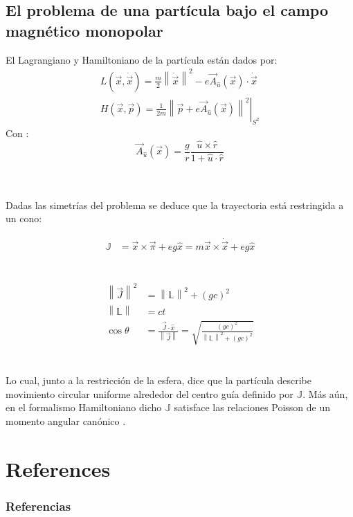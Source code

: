 \documentclass[xcolor=dvipsnames]{beamer}
\newcommand{\norm}[1]{\left\lVert #1 \right\rVert}
\newcommand{\roundP}[1]{\left( #1 \right)}
\begin{document}
\subsection{El problema de una partícula bajo el campo magnético monopolar}
\begin{frame}
El Lagrangiano y Hamiltoniano de la partícula están dados por:
\begin{align*}
L\roundP{\vec{x},\dot{\vec{x}}} = \frac{m}{2}\norm{\dot{\vec{x}}}^2 - e\vec{A}_{\hat{u}}(\vec{x})\cdot\dot{\vec{x}}\\
H\roundP{\vec{x},\vec{p}} = \left.\frac{1}{2m}\norm{\vec{p}+e\vec{A}_{\hat{u}}(\vec{x})}^2\right|_{S^2}
\end{align*}
Con \cite{vectorPotentials}:
\begin{equation*}
\vec{A}_{\hat{u}}(\vec{x}) = \frac{g}{r}\frac{\hat{u}\times\hat{r}}{1+\hat{u}\cdot\hat{r}}
\end{equation*}
\\~\\
\end{frame}
\begin{frame}
Dadas las simetrías del problema se deduce que la trayectoria está restringida a un cono:

\begin{align*}
\mathbb{J} &= \vec{x}\times\vec{\pi}+{eg}\hat{x} = m{\vec{x}}\times\dot{\vec{x}} + eg\hat{x}
\end{align*}
\\~\\
\begin{equation}
\begin{aligned}
\norm{\vec{J}}^2 &= \norm{\mathbb{L}}^2 +\roundP{gc}^2\\
\norm{\mathbb{L}} &= ct\\
\cos{\theta} &= \frac{\vec{J}\cdot\hat{x}}{\norm{\vec{J}}} = \sqrt{\frac{\roundP{gc}^2}{\norm{\mathbb{L}}^2 +\roundP{gc}^2}}
\end{aligned}
\label{eq:poincarecone}
\end{equation}
\\~\\
Lo cual, junto a la restricción de la esfera, dice que la partícula describe movimiento circular uniforme alrededor del centro guía definido por $\mathbb{J}$. Más aún, en el formalismo Hamiltoniano dicho $\mathbb{J}$ satisface las relaciones Poisson de un momento angular canónico \cite{haldane}.\\
\end{frame}

\section{References}
\begin{frame}[t, allowframebreaks]
\frametitle{Referencias}
\small


\end{frame}
\end{document}

